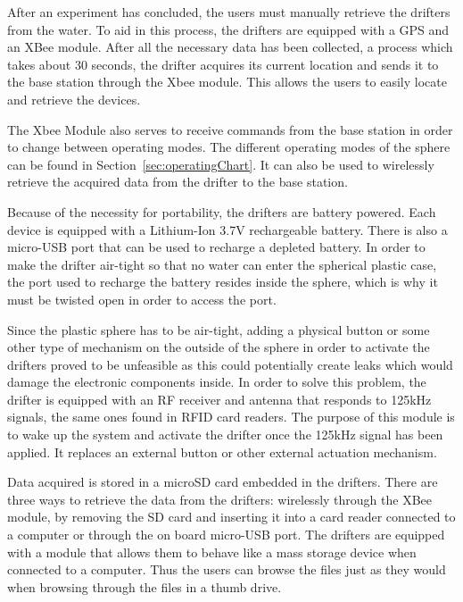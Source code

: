 
After an experiment has concluded, the users must manually retrieve the drifters from the water.  To aid in this process, the drifters are equipped with a GPS and an XBee module.  After all the necessary data has been collected, a process which takes about 30 seconds, the drifter acquires its current location and sends it to the base station through the Xbee module.  This allows the users to easily locate and retrieve the devices.

The Xbee Module also serves to receive commands from the base station in order to change between operating modes. The different operating modes of the sphere can be found in Section~\ref{sec:operatingChart}.  It can also be used to wirelessly retrieve the acquired data from the drifter to the base station.


Because of the necessity for portability, the drifters are battery powered.  Each device is equipped with a Lithium-Ion 3.7V rechargeable battery.  There is also a micro-USB port that can be used to recharge a depleted battery.  In order to make the drifter air-tight so that no water can enter the spherical plastic case, the port used to recharge the battery resides inside the sphere, which is why it must be twisted open in order to access the port.


Since the plastic sphere has to be air-tight, adding a physical button or some other type of mechanism on the outside of the sphere in order to activate the drifters proved to be unfeasible as this could potentially create leaks which would damage the electronic components inside. In order to solve this problem, the drifter is equipped with an RF receiver and antenna that responds to 125kHz signals, the same ones found in RFID card readers.  The purpose of this module is to wake up the system and activate the drifter once the 125kHz signal has been applied.  It replaces an external button or other external actuation mechanism.


Data acquired is stored in a microSD card embedded in the drifters.  There are three ways to retrieve the data from the drifters: wirelessly through the XBee module, by removing the SD card and inserting it into a card reader connected to a computer or through the on board micro-USB port.  The drifters are equipped with a module that allows them to behave like a mass storage device when connected to a computer.  Thus the users can browse the files just as they would when browsing through the files in a thumb drive.

